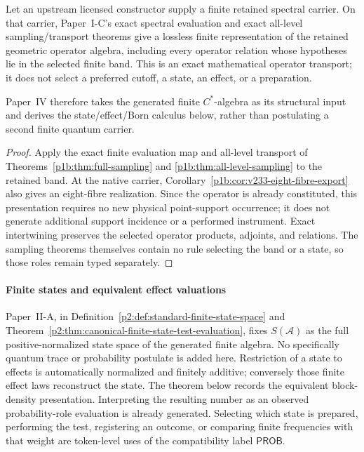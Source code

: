 \documentclass[12pt,a4paper]{article}
\begin{document}
\begin{proposition}
\label{p4:prop:exact-finite-operator-bridge}
Let an upstream licensed constructor supply a finite retained spectral carrier.
On that carrier, Paper~I-C's exact spectral evaluation and exact all-level
sampling/transport theorems give a lossless finite representation of the
retained geometric operator algebra, including every operator relation whose
hypotheses lie in the selected finite band.  This is an exact mathematical
operator transport; it does not select a preferred cutoff, a state, an
effect, or a preparation.

Paper~IV therefore takes the generated finite \(C^*\)-algebra as its
structural input and derives the state/effect/Born calculus below, rather than
postulating a second finite quantum carrier.
\end{proposition}
\begin{proof}
Apply the exact finite evaluation map and all-level transport of
Theorems~\ref{p1b:thm:full-sampling} and
\ref{p1b:thm:all-level-sampling} to the retained band.
At the native carrier, Corollary~\ref{p1b:cor:v233-eight-fibre-export}
also gives an eight-fibre realization. Since the operator is already
constituted, this presentation requires no new physical point-support
occurrence; it does not generate additional support incidence or a
performed instrument.  Exact intertwining
preserves the selected operator products, adjoints, and relations.  The
sampling theorems themselves contain no rule selecting the band or a state,
so those roles remain typed separately.
\end{proof}



\paragraph{Finite states and equivalent effect valuations}
\label{p4:sec:part1-states}

Paper~II-A, in Definition~\ref{p2:def:standard-finite-state-space} and
Theorem~\ref{p2:thm:canonical-finite-state-test-evaluation}, fixes
\(S(\mathcal A)\) as the full positive-normalized state space of the generated
finite algebra.  No specifically quantum trace or
probability postulate is added here.  Restriction of a state to effects is
automatically normalized and finitely additive; conversely those finite
effect laws reconstruct the state.  The theorem below records the equivalent
block-density presentation.  Interpreting the resulting number as an observed
probability-role evaluation is already generated.  Selecting which state is
prepared, performing the test, registering an outcome, or comparing finite
frequencies with that weight are token-level uses of the compatibility label
\(\mathsf{PROB}\).
\end{document}
